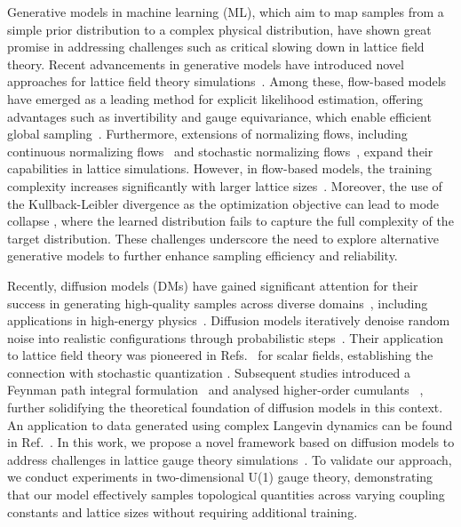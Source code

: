 \documentclass[a4paper,11pt]{article}
\begin{document}
Generative models in machine learning (ML), which aim to map samples from a simple prior distribution to a complex physical distribution, have shown great promise in addressing challenges such as critical slowing down in lattice field theory. Recent advancements in generative models have introduced novel approaches for lattice field theory simulations~\cite{Cranmer:2023xbe,Zhou:2023pti,Wang:2020hji}. Among these, flow-based models have emerged as a leading method for explicit likelihood estimation, offering advantages such as invertibility and gauge equivariance, which enable efficient global sampling~\cite{Kanwar:2020xzo,Boyda:2020hsi,Kanwar:2021wzm,Albergo:2021vyo,Cranmer:2023xbe,Kanwar:2024ujc,Chen:2022ytr}. Furthermore, extensions of normalizing flows, including continuous normalizing flows~\cite{chen:2018,deHaan:2021erb,Gerdes:2022eve,Caselle:2023mvh} and stochastic normalizing flows~\cite{wu2020stochastic,Caselle:2022acb,Bulgarelli:2024brv}, expand their capabilities in lattice simulations. However, in flow-based models, the training complexity increases significantly with larger lattice sizes~\cite{DelDebbio:2021qwf,Abbott:2022zsh,Komijani:2023fzy,Abbott:2023thq}. Moreover, the use of the Kullback-Leibler divergence as the optimization objective can lead to mode collapse \cite{Nicoli:2023qsl,Kanaujia:2024zrq}, where the learned distribution fails to capture the full complexity of the target distribution. These challenges underscore the need to explore alternative generative models to further enhance sampling efficiency and reliability. 

Recently, diffusion models (DMs) have gained significant attention for their success in generating high-quality samples across diverse domains~\cite{sohl-dickstein:2015deep,ho:2020denoising,song2019generative,Song:2021scorebased,yang2023diffusion,croitoru2023diffusion}, including applications in high-energy physics~\cite{Mikuni:2022xry,Amram:2023onf,Mikuni:2023dvk,Devlin:2023jzp}. Diffusion models iteratively denoise random noise into realistic configurations through probabilistic steps~\cite{bishop2023deep}. Their application to lattice field theory was pioneered in Refs.~\cite{Wang:2023exq,Wang:2023sry} for scalar fields, establishing the connection with stochastic quantization \cite{Parisi:1980ys,Damgaard:1987rr,Namiki:1993fd,Fukushima:2024oij}. Subsequent studies introduced a Feynman path integral formulation~\cite{Hirono:2024zyg} and analysed higher-order cumulants ~\cite{Aarts:2024rsl}, further solidifying the theoretical foundation of diffusion models in this context. An application to data generated using complex Langevin dynamics can be found in Ref.~\cite{Habibi:2024fbn}. In this work, we propose a novel framework based on diffusion models to address challenges in lattice gauge theory simulations~\cite{Zhu:2024kiu}. To validate our approach, we conduct experiments in two-dimensional U(1) gauge theory, demonstrating that our model effectively samples topological quantities across varying coupling constants and lattice sizes without requiring additional training. 
\end{document}
